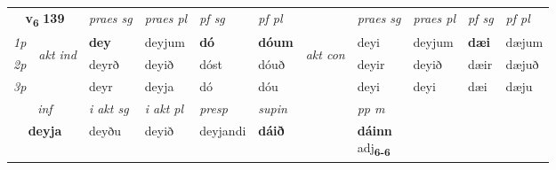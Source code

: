 \noindent
\begin{tabular}{lllllllllll} \toprule
\multicolumn{2}{c}{\textbf{v{\textsubscript{6}}} \Large{\textbf{139}}}  &  \textit{praes sg}  & \textit{praes pl}  &\textit{ pf sg} & \textit{pf pl} &  &  \textit{praes sg}  & \textit{praes pl}  & \textit{pf sg} & \textit{pf pl } \\*
	\cmidrule{3-6} \cmidrule{8-11}
 {\textit{1p}} & \multirow{3}{*}{\begin{turn}{90}\textit{akt ind}\end{turn}} & \textbf{dey} & deyjum & \textbf{dó} & \textbf{dóum} & \multirow{3}{*}{\begin{turn}{90}\textit{akt con}\end{turn}} &deyi & deyjum & \textbf{dæi} & dæjum\\*
 {\textit{2p}} &  &  deyrð  & deyið & dóst & dóuð & & deyir & deyið & dæir & dæjuð \\*
{\textit{3p}} &  & deyr & deyja & dó & dóu & & deyi & deyi& dæi & dæju \\*
\cmidrule{3-6} \cmidrule{8-11}

   \multicolumn{2}{c}{\textit{inf}}  & \textit{i akt sg} & \textit{i akt pl}   & \textit{presp} & \textit{supin}  && \textit{pp m} \\*
  \multicolumn{2}{c}{\textbf{deyja}} & deyðu  & deyið   & deyjandi &  \textbf{dáið}  && \specialcell{\textbf{dáinn} \\ adj\textbf{\textsubscript{6-6}}} \\*
\end{tabular}

